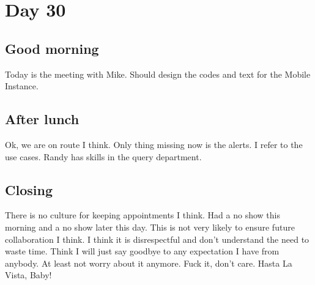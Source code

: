 \section{Day 30}
\subsection{Good morning}
Today is the meeting with Mike. 
Should design the codes and text for the Mobile Instance.
\subsection{After lunch}
Ok, we are on route I think.
Only thing missing now is the alerts.
I refer to the use cases.
Randy has skills in the query department. 
\subsection{Closing}
There is no culture for keeping appointments I think.
Had a no show this morning and a no show later this day.
This is not very likely to ensure future collaboration I think.
I think it is disrespectful and don't understand the need to waste time.
Think I will just say goodbye to any expectation I have from anybody.
At least not worry about it anymore.
Fuck it, don't care.
Hasta La Vista, Baby!
